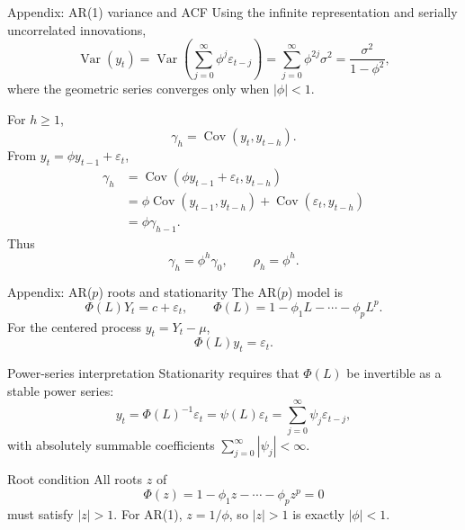 \documentclass[10pt]{beamer}
\DeclareMathOperator{\Cov}{Cov}
\DeclareMathOperator{\Var}{Var}
\newcommand{\eps}{\varepsilon}
\begin{document}
\begin{frame}{Appendix: AR(1) variance and ACF}
\label{app:ar1-acf}
\small
Using the infinite representation and serially uncorrelated innovations,
\[
\Var(y_t)=
\Var\left(\sum_{j=0}^{\infty}\phi^j\eps_{t-j}\right)
=\sum_{j=0}^{\infty}\phi^{2j}\sigma^2
=\frac{\sigma^2}{1-\phi^2},
\]
where the geometric series converges only when $|\phi|<1$.

\medskip
For $h\geq 1$,
\[
\gamma_h=\Cov(y_t,y_{t-h}).
\]
From $y_t=\phi y_{t-1}+\eps_t$,
\begin{align*}
\gamma_h
&=\Cov(\phi y_{t-1}+\eps_t,y_{t-h})\\
&=\phi\Cov(y_{t-1},y_{t-h})+\Cov(\eps_t,y_{t-h})\\
&=\phi\gamma_{h-1}.
\end{align*}
Thus
\[
\gamma_h=\phi^h\gamma_0,
\qquad
\rho_h=\phi^h.
\]

\hfill\hyperlink{slide:ar1_acf}{}
\end{frame}

\begin{frame}{Appendix: AR($p$) roots and stationarity}
\label{app:arp-roots}
\footnotesize
The AR($p$) model is
\[
\Phi(L)Y_t=c+\eps_t,
\qquad
\Phi(L)=1-\phi_1L-\cdots-\phi_pL^p.
\]
For the centered process $y_t=Y_t-\mu$,
\[
\Phi(L)y_t=\eps_t.
\]

\begin{block}{Power-series interpretation}
Stationarity requires that $\Phi(L)$ be invertible as a stable power series:
\[
y_t=\Phi(L)^{-1}\eps_t
=\psi(L)\eps_t
=\sum_{j=0}^{\infty}\psi_j\eps_{t-j},
\]
with absolutely summable coefficients $\sum_{j=0}^{\infty}|\psi_j|<\infty$.
\end{block}

\begin{alertblock}{Root condition}
All roots $z$ of
\[
\Phi(z)=1-\phi_1z-\cdots-\phi_pz^p=0
\]
must satisfy $|z|>1$. For AR(1), $z=1/\phi$, so $|z|>1$ is exactly $|\phi|<1$.
\end{alertblock}

\hfill\hyperlink{slide:arp_roots}{}
\end{frame}
\end{document}
